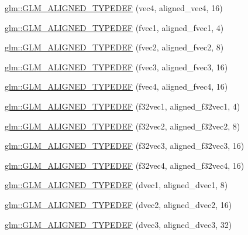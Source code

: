 \begin{DoxyCompactItemize}
\item 
\hyperlink{group__gtx__type__aligned_ga12fe7b9769c964c5b48dcfd8b7f40198}{glm\-::\-G\-L\-M\-\_\-\-A\-L\-I\-G\-N\-E\-D\-\_\-\-T\-Y\-P\-E\-D\-E\-F} (vec4, aligned\-\_\-vec4, 16)
\item 
\hyperlink{group__gtx__type__aligned_gaefab04611c7f8fe1fd9be3071efea6cc}{glm\-::\-G\-L\-M\-\_\-\-A\-L\-I\-G\-N\-E\-D\-\_\-\-T\-Y\-P\-E\-D\-E\-F} (fvec1, aligned\-\_\-fvec1, 4)
\item 
\hyperlink{group__gtx__type__aligned_ga2543c05ba19b3bd19d45b1227390c5b4}{glm\-::\-G\-L\-M\-\_\-\-A\-L\-I\-G\-N\-E\-D\-\_\-\-T\-Y\-P\-E\-D\-E\-F} (fvec2, aligned\-\_\-fvec2, 8)
\item 
\hyperlink{group__gtx__type__aligned_ga009afd727fd657ef33a18754d6d28f60}{glm\-::\-G\-L\-M\-\_\-\-A\-L\-I\-G\-N\-E\-D\-\_\-\-T\-Y\-P\-E\-D\-E\-F} (fvec3, aligned\-\_\-fvec3, 16)
\item 
\hyperlink{group__gtx__type__aligned_ga2f26177e74bfb301a3d0e02ec3c3ef53}{glm\-::\-G\-L\-M\-\_\-\-A\-L\-I\-G\-N\-E\-D\-\_\-\-T\-Y\-P\-E\-D\-E\-F} (fvec4, aligned\-\_\-fvec4, 16)
\item 
\hyperlink{group__gtx__type__aligned_ga309f495a1d6b75ddf195b674b65cb1e4}{glm\-::\-G\-L\-M\-\_\-\-A\-L\-I\-G\-N\-E\-D\-\_\-\-T\-Y\-P\-E\-D\-E\-F} (f32vec1, aligned\-\_\-f32vec1, 4)
\item 
\hyperlink{group__gtx__type__aligned_ga5e185865a2217d0cd47187644683a8c3}{glm\-::\-G\-L\-M\-\_\-\-A\-L\-I\-G\-N\-E\-D\-\_\-\-T\-Y\-P\-E\-D\-E\-F} (f32vec2, aligned\-\_\-f32vec2, 8)
\item 
\hyperlink{group__gtx__type__aligned_gade4458b27b039b9ca34f8ec049f3115a}{glm\-::\-G\-L\-M\-\_\-\-A\-L\-I\-G\-N\-E\-D\-\_\-\-T\-Y\-P\-E\-D\-E\-F} (f32vec3, aligned\-\_\-f32vec3, 16)
\item 
\hyperlink{group__gtx__type__aligned_ga2e8a12c5e6a9c4ae4ddaeda1d1cffe3b}{glm\-::\-G\-L\-M\-\_\-\-A\-L\-I\-G\-N\-E\-D\-\_\-\-T\-Y\-P\-E\-D\-E\-F} (f32vec4, aligned\-\_\-f32vec4, 16)
\item 
\hyperlink{group__gtx__type__aligned_ga3e0f35fa0c626285a8bad41707e7316c}{glm\-::\-G\-L\-M\-\_\-\-A\-L\-I\-G\-N\-E\-D\-\_\-\-T\-Y\-P\-E\-D\-E\-F} (dvec1, aligned\-\_\-dvec1, 8)
\item 
\hyperlink{group__gtx__type__aligned_ga78bfec2f185d1d365ea0a9ef1e3d45b8}{glm\-::\-G\-L\-M\-\_\-\-A\-L\-I\-G\-N\-E\-D\-\_\-\-T\-Y\-P\-E\-D\-E\-F} (dvec2, aligned\-\_\-dvec2, 16)
\item 
\hyperlink{group__gtx__type__aligned_ga01fe6fee6db5df580b6724a7e681f069}{glm\-::\-G\-L\-M\-\_\-\-A\-L\-I\-G\-N\-E\-D\-\_\-\-T\-Y\-P\-E\-D\-E\-F} (dvec3, aligned\-\_\-dvec3, 32)

\end{DoxyCompactItemize}
